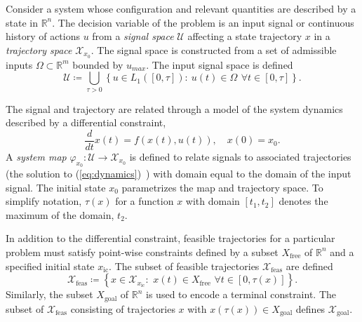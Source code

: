 \documentclass{llncs}
\begin{document}
Consider a system whose configuration and relevant quantities are described by a state in $\mathbb{R}^{n}$. 
%
The decision variable of the problem is an input signal or continuous history of actions $u$ from a \textit{signal space} $\mathcal{U}$ affecting a state trajectory $x$ in a \textit{trajectory space} $\mathcal{X}_{x_0}$. The signal space is constructed from a set of admissible inputs $\Omega\subset\mathbb{R}^{m}$ bounded by $u_{max}$. The input signal space is defined
%
\begin{equation}
\mathcal{U}\coloneqq\bigcup_{\tau>0}\left\{ u\in L_{1}([0,\tau]):\: u(t)\in\Omega\:\,\forall t\in[0,\tau]\right\}. \label{eq:signal_space}
\end{equation}

%
The signal and trajectory are related through a model of the system dynamics described by a differential
constraint,
% 
\begin{equation}
\frac{d}{dt}x(t)=f(x(t),u(t)), \quad x(0)=x_0\label{eq:dynamics}.
\end{equation}
%
A \textit{system map} $\varphi_{x_0}:\mathcal{U}\rightarrow\mathcal{X}_{x_0}$ is defined to relate signals to associated trajectories (the solution to (\ref{eq:dynamics})~\cite[cf. pg. 42]{coddington1955theory}) with domain equal to the domain of the input signal. 
%
The initial state $x_0$ parametrizes the map and trajectory space. 
%
To simplify notation, $\tau(x)$ for a function $x$ with domain $[t_1,t_2]$ denotes the maximum of the domain, $t_2$.   

In addition to the differential constraint, feasible trajectories for a particular problem must satisfy point-wise constraints defined by a subset $X_\mathrm{free}$ of $\mathbb{R}^n$ and a specified initial state $x_\mathrm{ic}$. 
%
The subset of feasible trajectories $\mathcal{X}_\mathrm{feas}$ are defined 
%
\begin{equation}
\mathcal{X}_\mathrm{feas}\coloneqq \left\{ x\in \mathcal{X}_{x_\mathrm{ic}}:\,\, x(t)\in X_\mathrm{free}\,\, \forall t\in [0,\tau (x)] \right\}.
\end{equation}
%
Similarly, the subset $X_\mathrm{goal}$ of $\mathbb{R}^n$  is used to encode a terminal constraint. The subset of $\mathcal{X}_\mathrm{feas}$ consisting of trajectories $x$ with $x(\tau(x))\in X_\mathrm{goal}$ defines $\mathcal{X}_\mathrm{goal}$.
%
% 
%
\end{document}
